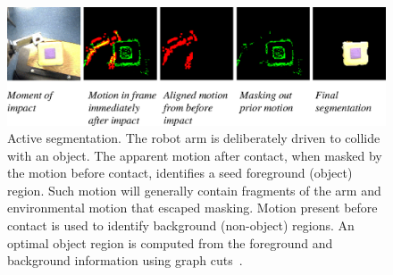 \begin{figure}[bt]
\includegraphics[width=\columnwidth]{fig-separate-simple}
\caption
{
\label{fig:separate-simple}
%
Active segmentation.  The robot arm is deliberately driven
to collide with an object.
 The
apparent motion after contact, when masked by the motion before
contact, identifies a seed foreground (object) region.  Such motion
will generally contain fragments of the arm and environmental motion
that escaped masking.  Motion present before contact is used to
identify background (non-object) regions.  
An optimal object region is computed from the foreground and
background information using graph cuts~\citep{fitzpatrick03first}.
%
%
}
\end{figure}

